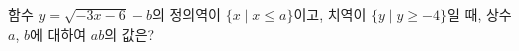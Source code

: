 함수 $y=\sqrt{-3x-6}-b$의 정의역이 $\{x \mid x\le a\}$이고, 치역이 $\{y \mid y\ge -4\}$일 때, 상수 $a$, $b$에 대하여 $ab$의 값은?
